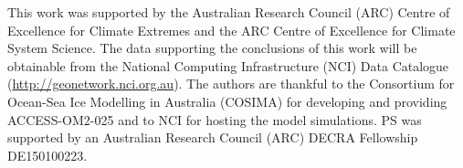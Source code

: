 \documentclass[draft,linenumbers]{agujournal2018}
\begin{document}
\acknowledgments
This work was supported by the Australian Research Council (ARC) Centre of Excellence for Climate Extremes and the ARC Centre of Excellence for Climate System Science. The data supporting the conclusions of this work will be obtainable from the National Computing Infrastructure (NCI) Data Catalogue (\url{http://geonetwork.nci.org.au}). The authors are thankful to the Consortium for Ocean-Sea Ice Modelling in Australia (COSIMA) for developing and providing ACCESS-OM2-025 and to NCI for hosting the model simulations. PS was supported by an Australian Research Council (ARC) DECRA Fellowship DE150100223.
 

\end{document}
